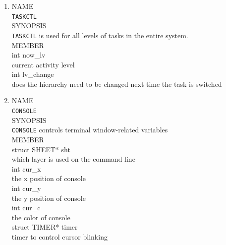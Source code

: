 \documentclass{swfcthesis}
\begin{document}
\begin{enumerate}
  \item
  NAME \\
  \hspace*{1cm}\texttt{TASKCTL} \\
  SYNOPSIS \\
  \hspace*{1cm} \texttt{TASKCTL} is used for all levels of tasks in the entire system.\\
  MEMBER \\
  \hspace*{1cm} int now\_lv\\
  \hspace*{1.5cm}  current activity level\\
  \hspace*{1cm} int lv\_change\\
  \hspace*{1.5cm} does the hierarchy need to be changed next time the task is switched\\

  \item
  NAME \\
  \hspace*{1cm}\texttt{CONSOLE} \\
  SYNOPSIS \\
  \hspace*{1cm} \texttt{CONSOLE} controls terminal window-related variables\\
  MEMBER \\
  \hspace*{1cm} struct SHEET* sht\\
  \hspace*{1.5cm}  which layer is used on the command line\\
  \hspace*{1cm} int cur\_x\\
  \hspace*{1.5cm} the x position of console\\
  \hspace*{1cm} int cur\_y \\
  \hspace*{1.5cm} the y position of console\\
  \hspace*{1cm} int cur\_c\\
  \hspace*{1.5cm} the color of console \\
  \hspace*{1cm} struct TIMER* timer\\
  \hspace*{1.5cm} timer to control cursor blinking\\
  

\end{enumerate}
\end{document}
